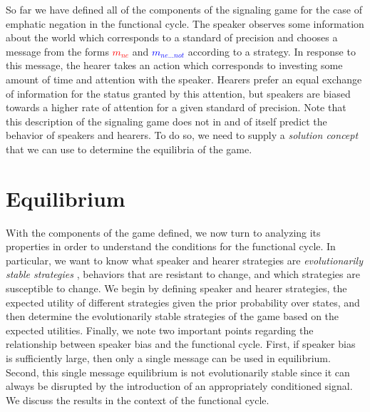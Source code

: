 \documentclass[linguex]{sp}
\theoremstyle{definition} \newtheorem{definition}{Definition}
\begin{document}
So far we have defined all of the components of the signaling game for the case of emphatic negation in the functional cycle. The speaker observes some information about the world which corresponds to a standard of precision and chooses a message from the forms \emph{\textcolor{red}{$m_{ne}$}} and \emph{\textcolor{blue}{$m_{ne...not}$}} according to a strategy. In response to this message, the hearer takes an action which corresponds to investing some amount of time and attention with the speaker. Hearers prefer an equal exchange of information for the status granted by this attention, but speakers are biased towards a higher rate of attention for a given standard of precision. Note that this description of the signaling game does not in and of itself predict the behavior of speakers and hearers. To do so, we need to supply a \emph{solution concept} that we can use to determine the equilibria of the game.


\section{Equilibrium}
\label{Equilibrium}

With the components of the game defined, we now turn to analyzing its properties in order to understand the conditions for the functional cycle. In particular, we want to know what speaker and hearer strategies are \emph{evolutionarily stable strategies} \citep{maynard-smith1982}, behaviors that are resistant to change, and which strategies are susceptible to change. We begin by defining speaker and hearer strategies, the expected utility of different strategies given the prior probability over states, and then determine the evolutionarily stable strategies of the game based on the expected utilities. Finally, we note two important points regarding the relationship between speaker bias and the functional cycle.  First, if speaker bias is sufficiently large, then only a single message can be used in equilibrium. Second, this single message equilibrium is not evolutionarily stable since it can always be disrupted by the introduction of an appropriately conditioned signal. We discuss the results in the context of the functional cycle.
\end{document}
